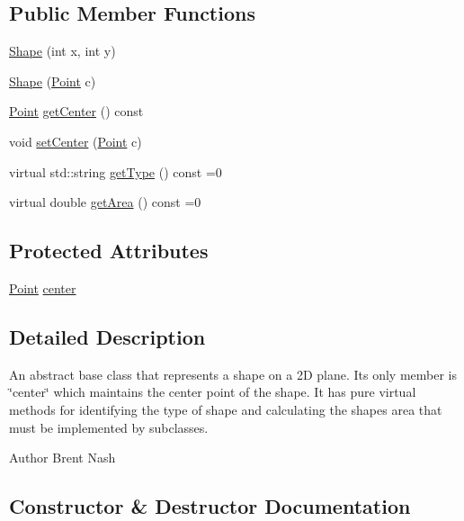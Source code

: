 \subsection*{Public Member Functions}
\begin{DoxyCompactItemize}
\item 
\hyperlink{class_shape_a2ff2a9c01af9b5e717d97bb06a049d76}{Shape} (int x, int y)
\item 
\hyperlink{class_shape_a5df33f53d708b57861ba3c0dcafe992f}{Shape} (\hyperlink{class_point}{Point} c)
\item 
\hyperlink{class_point}{Point} \hyperlink{class_shape_a9b1d468936ed9200a2d845030716b83c}{get\+Center} () const 
\item 
void \hyperlink{class_shape_a53e6bbf78c449b52cff5b91e99bf31b1}{set\+Center} (\hyperlink{class_point}{Point} c)
\item 
virtual std\+::string \hyperlink{class_shape_a3703ac99c3b3008da7b57ddbe00b7d29}{get\+Type} () const =0
\item 
virtual double \hyperlink{class_shape_ad9454ee04617290547e7529180b1beae}{get\+Area} () const =0
\end{DoxyCompactItemize}
\subsection*{Protected Attributes}
\begin{DoxyCompactItemize}
\item 
\hyperlink{class_point}{Point} \hyperlink{class_shape_afa00babba48f541ad2754cb22a83c421}{center}
\end{DoxyCompactItemize}


\subsection{Detailed Description}
An abstract base class that represents a shape on a 2D plane. Its only member is \char`\"{}center\char`\"{} which maintains the center point of the shape. It has pure virtual methods for identifying the type of shape and calculating the shape\textquotesingle{}s area that must be implemented by subclasses.

\begin{DoxyAuthor}{Author}
Brent Nash 
\end{DoxyAuthor}


\subsection{Constructor \& Destructor Documentation}
